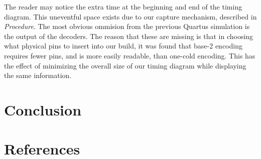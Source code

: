 \documentclass[titlepage]{article}
\begin{document}
        The reader may notice the extra time at the beginning and end of the timing diagram.
        This uneventful space exists due to our capture mechanism, described in \textit{Procedure}.
        The most obvious ommision from the previous Quartus simulation is the output of the decoders.
        The reason that these are missing is that in choosing what physical pins to insert into our build, it was found that base-2 encoding requires fewer pins, and is more easily readable, than one-cold encoding.
        This has the effect of minimizing the overall size of our timing diagram while displaying the same information.
        
    \section{Conclusion}
        
    \section{References}
        
    
\end{document}
